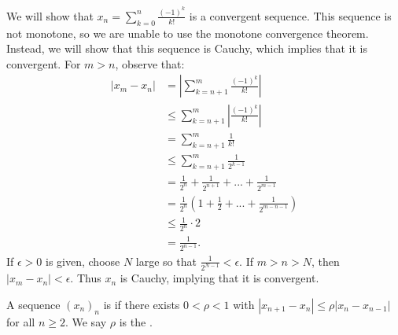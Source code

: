    \begin{example}
        We will show that $x_n = \sum_{k = 0}^n \frac{(-1)^k}{k!}$ is a convergent sequence. This sequence is not monotone, so we are unable to use the monotone convergence theorem. Instead, we will show that this sequence is Cauchy, which implies that it is convergent. For $m > n$, observe that:
            \begin{equation*}
            \begin{split}
                |x_m - x_n|
                & = \left|\sum_{k = n + 1}^m \frac{(-1)^k}{k!}\right| \\
                & \leq \sum_{k = n + 1}^m \left|\frac{(-1)^k}{k!}\right| \\
                & = \sum_{k = n+1}^m \frac{1}{k!} \\
                & \leq \sum_{k = n+1}^m \frac{1}{2^{k-1}} \\
                & = \frac{1}{2^n} + \frac{1}{2^{n+1}} + ... + \frac{1}{2^{m-1}} \\
                & = \frac{1}{2^n} \left(1 + \frac{1}{2} + ... + \frac{1}{2^{m-n-1}}\right) \\
                & \leq \frac{1}{2^n}\cdot 2 \\
                & = \frac{1}{2^{n-1}}.
            \end{split}
            \end{equation*}
        If $\epsilon > 0$ is given, choose $N$ large so that $\frac{1}{2^{N - 1}} < \epsilon$. If $m > n > N$, then $|x_m - x_n| < \epsilon$. Thus $x_n$ is Cauchy, implying that it is convergent.
    \end{example}

    \begin{definition}
        A sequence $(x_n)_n$ is  if there exists $0 < \rho < 1$ with $|x_{n+1} - x_n| \leq \rho |x_n - x_{n-1}|$ for all $n \geq 2$. We say $\rho$ is the .
    \end{definition}

